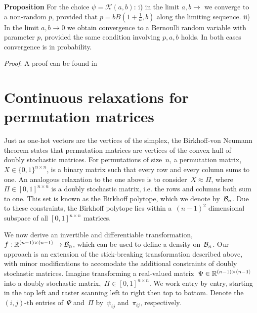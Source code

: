 \documentclass{article}
\begin{document}
\textbf{Proposition} For the choice $\psi=\mathcal{K}(a,b)$: i) in the limit $a,b \rightarrow $  we converge to a non-random $p$, provided that $p=bB\left(1+\frac{1}{a},b\right)$ along the limiting sequence. ii) In the limit $a,b\rightarrow 0$ we obtain convergence to a Bernoulli random variable with parameter $p$, provided the same condition involving $p,a,b$ holds. In both cases convergence is in probability.


\textit{Proof}: A proof can be found in \cite{mitnik2013kumar}
\section{Continuous relaxations for permutation matrices}
Just as one-hot vectors are the vertices of the simplex, the Birkhoff-von Neumann
theorem states that permutation matrices are vertices of the convex
hull of doubly stochastic matrices.
For permutations of size~$n$, a permutation matrix,~$X \in \{0,1\}^{n \times n}$,
is a binary matrix such that every row and every column sums to one.
An analogous relaxation to the one above is to consider~$X \approx {\Pi}$,
where~${\Pi} \in [0,1]^{n \times n}$ is a doubly stochastic matrix,
i.e. the rows and columns both sum to one. This set is known as the Birkhoff
polytope, which we denote by~$\mathcal{B}_n$. Due to these constraints, the Birkhoff
polytope lies within a~$(n-1)^2$ dimensional subspace of all $[0,1]^{n \times n}$ matrices. 

We now derive an invertible and differentiable transformation,~$f: \mathbb{R}^{(n-1) \times (n-1)} \to \mathcal{B}_n$,
which can be used to define a density on~$\mathcal{B}_n$. Our approach is an
extension of the stick-breaking transformation described above, with minor
modifications to accomodate the additional constraints of doubly stochastic
matrices. Imagine transforming a real-valued matrix~$\Psi \in \mathbb{R}^{(n-1) \times (n-1)}$
into a doubly stochastic matrix,~${\Pi} \in [0,1]^{n \times n}$.
We work entry by entry, starting in the top left
and raster scanning left to right then top to bottom. Denote the~$(i,j)$-th entries
of~$\Psi$ and~${\Pi}$ by~$\psi_{ij}$ and~${\pi}_{ij}$, respectively.
\end{document}
